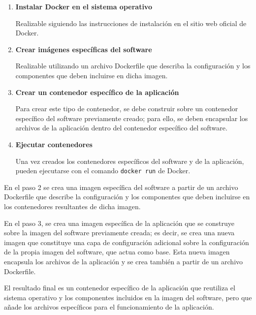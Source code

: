                 \begin{enumerate}

                    \item \textbf{Instalar Docker en el sistema operativo}
                    
                    Realizable siguiendo las instrucciones de instalación en el sitio web oficial de Docker.
                
                    \item \textbf{Crear imágenes específicas del software}
                    
                    Realizable utilizando un archivo Dockerfile que describa la configuración y los componentes que deben incluirse en dicha imagen.

                    \item \textbf{Crear un contenedor específico de la aplicación}

                    Para crear este tipo de contenedor, se debe construir sobre un contenedor específico del software previamente creado; para ello, se deben encapsular los archivos de la aplicación dentro del contenedor específico del software.

                    \item \textbf{Ejecutar contenedores}
                    
                    Una vez creados los contenedores específicos del software y de la aplicación, pueden ejecutarse con el comando \texttt{docker run} de Docker.

                \end{enumerate}

                En el paso 2 se crea una imagen específica del software a partir de un archivo Dockerfile que describe la configuración y los componentes que deben incluirse en los contenedores resultantes de dicha imagen.

                En el paso 3, se crea una imagen específica de la aplicación que se construye sobre la imagen del software previamente creada; es decir, se crea una nueva imagen que constituye una capa de configuración adicional sobre la configuración de la propia imagen del software, que actua como base. Esta nueva imagen encapsula los archivos de la aplicación y se crea también a partir de un archivo Dockerfile.

                El resultado final es un contenedor específico de la aplicación que reutiliza el sistema operativo y los componentes incluidos en la imagen del software, pero que añade los archivos específicos para el funcionamiento de la aplicación.

